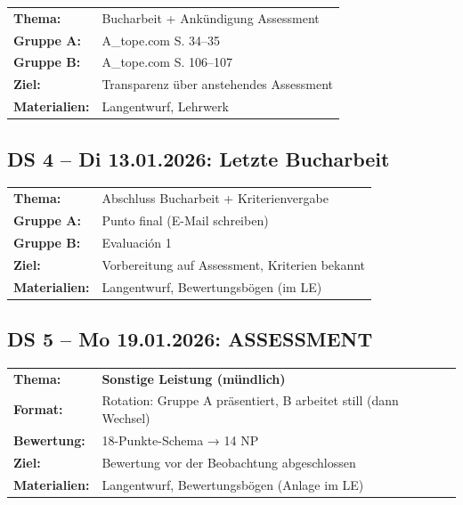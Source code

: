 \documentclass[11pt, a4paper]{article}
\begin{document}
\begin{tabular}{ll}
\textbf{Thema:} & Bucharbeit + Ankündigung Assessment \\
\textbf{Gruppe A:} & A\_tope.com S. 34--35 \\
\textbf{Gruppe B:} & A\_tope.com S. 106--107 \\
\textbf{Ziel:} & Transparenz über anstehendes Assessment \\
\textbf{Materialien:} & Langentwurf, Lehrwerk \\
\end{tabular}

\vspace{0.5cm}

\subsection*{DS 4 -- Di 13.01.2026: Letzte Bucharbeit}

\begin{tabular}{ll}
\textbf{Thema:} & Abschluss Bucharbeit + Kriterienvergabe \\
\textbf{Gruppe A:} & Punto final (E-Mail schreiben) \\
\textbf{Gruppe B:} & Evaluación 1 \\
\textbf{Ziel:} & Vorbereitung auf Assessment, Kriterien bekannt \\
\textbf{Materialien:} & Langentwurf, Bewertungsbögen (im LE) \\
\end{tabular}

\vspace{0.5cm}

\subsection*{DS 5 -- Mo 19.01.2026: ASSESSMENT}

\begin{tabular}{ll}
\textbf{Thema:} & \textbf{Sonstige Leistung (mündlich)} \\
\textbf{Format:} & Rotation: Gruppe A präsentiert, B arbeitet still (dann Wechsel) \\
\textbf{Bewertung:} & 18-Punkte-Schema → 14 NP \\
\textbf{Ziel:} & Bewertung vor der Beobachtung abgeschlossen \\
\textbf{Materialien:} & Langentwurf, Bewertungsbögen (Anlage im LE) \\
\end{tabular}
\end{document}
